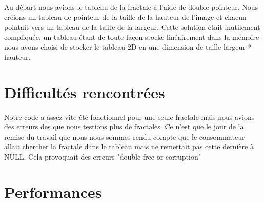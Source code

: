 \documentclass[10pt,a4paper]{article}
\begin{document}
Au départ nous avions le tableau de la fractale à l'aide de double pointeur.
Nous créions un tableau de pointeur de la taille de la hauteur de l'image et chacun pointait vers un tableau de la taille de la largeur.
Cette solution était inutilement compliquée, un tableau étant de toute façon stocké linéairement dans la mémoire nous avons choisi de stocker le tableau 2D en une dimension de taille largeur * hauteur.

\section{Difficultés rencontrées}

Notre code a assez vite été fonctionnel pour une seule fractale mais nous avions des erreurs des que nous testions plus de fractales. Ce n'est que le jour de la remise du travail que nous nous sommes rendu compte que le consommateur allait chercher la fractale dans le tableau mais ne remettait pas cette dernière à NULL. Cela provoquait des erreurs "double free or corruption" 

\section{Performances}




\end{document}
